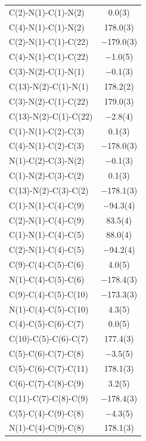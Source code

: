 \pagebreak
\begin{center}
\tablefirsthead{%
\toprule}
\tablelasttail{\bottomrule}
{\footnotesize \singlespacing
\begin{supertabular}{p{1.8in}c}
C(2)-N(1)-C(1)-N(2)&0.0(3)\\
C(4)-N(1)-C(1)-N(2)&178.0(3)\\
C(2)-N(1)-C(1)-C(22)&$-$179.0(3)\\
C(4)-N(1)-C(1)-C(22)&$-$1.0(5)\\
C(3)-N(2)-C(1)-N(1)&$-$0.1(3)\\
C(13)-N(2)-C(1)-N(1)&178.2(2)\\
C(3)-N(2)-C(1)-C(22)&179.0(3)\\
C(13)-N(2)-C(1)-C(22)&$-$2.8(4)\\
C(1)-N(1)-C(2)-C(3)&0.1(3)\\
C(4)-N(1)-C(2)-C(3)&$-$178.0(3)\\
N(1)-C(2)-C(3)-N(2)&$-$0.1(3)\\
C(1)-N(2)-C(3)-C(2)&0.1(3)\\
C(13)-N(2)-C(3)-C(2)&$-$178.1(3)\\
C(1)-N(1)-C(4)-C(9)&$-$94.3(4)\\
C(2)-N(1)-C(4)-C(9)&83.5(4)\\
C(1)-N(1)-C(4)-C(5)&88.0(4)\\
C(2)-N(1)-C(4)-C(5)&$-$94.2(4)\\
C(9)-C(4)-C(5)-C(6)&4.0(5)\\
N(1)-C(4)-C(5)-C(6)&$-$178.4(3)\\
C(9)-C(4)-C(5)-C(10)&$-$173.3(3)\\
N(1)-C(4)-C(5)-C(10)&4.3(5)\\
C(4)-C(5)-C(6)-C(7)&0.0(5)\\
C(10)-C(5)-C(6)-C(7)&177.4(3)\\
C(5)-C(6)-C(7)-C(8)&$-$3.5(5)\\
C(5)-C(6)-C(7)-C(11)&178.1(3)\\
C(6)-C(7)-C(8)-C(9)&3.2(5)\\
C(11)-C(7)-C(8)-C(9)&$-$178.4(3)\\
C(5)-C(4)-C(9)-C(8)&$-$4.3(5)\\
N(1)-C(4)-C(9)-C(8)&178.1(3)\\

\end{supertabular}}
\end{center}

